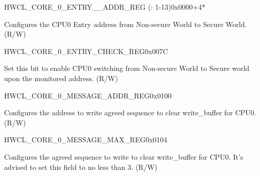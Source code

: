 \begin{register}{H}{WCL\_CORE\_0\_ENTRY\_\_ADDR\_REG (: 1-13)}{0x0000+4*}\label{regdesc:WCLCORE0ENTRYnADDRREG}
%
\regnewline%
\begin{regdesc}\begin{reglist}
\label{fielddesc:WCLCORE0ENTRY1ADDR}\item [WCL\_CORE\_0\_ENTRY\_\regindex{n}\_ADDR] Configures the CPU0 Entry  address from Non-secure World to Secure World. (R/W)
\end{reglist}\end{regdesc}
\end{register}


\begin{register}{H}{WCL\_CORE\_0\_ENTRY\_CHECK\_REG}{0x007C}\label{regdesc:WCLCORE0ENTRYCHECKREG}
%
%
%
\regnewline%
\begin{regdesc}\begin{reglist}
\label{fielddesc:WCLCORE0ENTRYCHECK}\item [WCL\_CORE\_0\_ENTRY\_CHECK] Set this bit to enable CPU0 switching from Non-secure World to Secure world upon the monitored address. (R/W)
\end{reglist}\end{regdesc}
\end{register}


\begin{register}{H}{WCL\_CORE\_0\_MESSAGE\_ADDR\_REG}{0x0100}\label{regdesc:WCLCORE0MESSAGEADDRREG}
%
\regnewline%
\begin{regdesc}\begin{reglist}
\label{fielddesc:WCLCORE0MESSAGEADDR}\item [WCL\_CORE\_0\_MESSAGE\_ADDR] Configures the address to write agreed sequence to clear write\_buffer for CPU0. (R/W)
\end{reglist}\end{regdesc}
\end{register}


\begin{register}{H}{WCL\_CORE\_0\_MESSAGE\_MAX\_REG}{0x0104}\label{regdesc:WCLCORE0MESSAGEMAXREG}
%
%
\regnewline%
\begin{regdesc}\begin{reglist}
\label{fielddesc:WCLCORE0MESSAGEMAX}\item [WCL\_CORE\_0\_MESSAGE\_MAX] Configures the agreed sequence to write to clear write\_buffer for CPU0. It's advised to set this field to no less than 3. (R/W)
\end{reglist}\end{regdesc}
\end{register}


